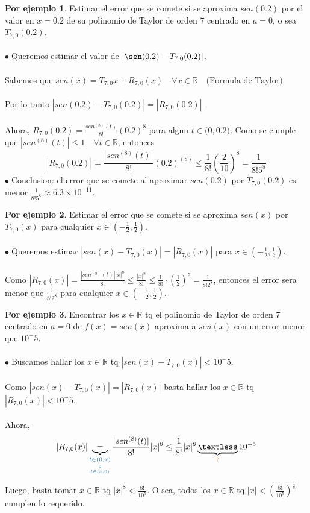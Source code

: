 \documentclass{article}
\theoremstyle{definition}
\newtheorem*{ej}{Por ejemplo}
\theoremstyle{remark}
\newcommand\bl{$\bullet\;$}
\begin{document}
\begin{ej}
  Estimar el error que se comete si se aproxima $sen(0.2)$ por el valor en $x=0.2$ de su polinomio de Taylor de orden $7$ centrado en $a=0$, o sea $T_{7,0}(0.2)$. \\ \\ 
  \bl Queremos estimar el valor de $|\sen(0.2)-T_{7,0}(0.2)|$. \\\\ Sabemos que $sen(x)=T_{7,0}{x}+R_{7,0}(x) \quad \forall x \in \mathbb{R} \quad \big(\text{Formula de Taylor}\big)$ \\\\ Por lo tanto $|sen(0.2)-T_{7,0}(0.2)|=|R_{7,0}(0.2)|$. \\ \\Ahora, $R_{7,0}(0.2)=\frac{sen^{(8)}(t)}{8!}(0.2)^8$ para algun $t \in \big(0,0.2\big)$. Como se cumple que $|sen^{(8)}(t)|\leq 1 \quad \forall t \in \mathbb{R}$, entonces \[ 
    |R_{7,0}(0.2)|=\frac{|sen^{(8)}(t)|}{8!}(0.2)^{(8)} \leq \frac{1}{8!}\left(\frac{2}{10}\right)^8 = \frac{1}{8!5^8}
\]
\bl \underline{Conclusion}: el error que se comete al aproximar $sen(0.2)$ por $T_{7,0}(0.2)$ es menor $\frac{1}{8!5^8} \approx 6.3\times10^{-11}$.
\end{ej}
\begin{ej}
  Estimar el error que se comete si se aproxima $sen(x)$ por $T_{7,0}(x)$ para cualquier $x \in \left(-\frac{1}{2},\frac{1}{2}\right)$. \\ \\
  \bl Queremos estimar $|sen(x)-T_{7,0}(x)|=|R_{7,0}(x)|$ para $x \in \left(-\frac{1}{2},\frac{1}{2}\right)$.
  \\\\
  Como $|R_{7,0}(x)|=\frac{|sen^{(8)}(t)||x|^8}{8!} \leq \frac{|x|^8}{8!} \leq \frac{1}{8!} \cdot\left(\frac{1}{2}\right)^8 = \frac{1}{8!2^8}$, entonces el error sera menor que $\frac{1}{8!2^8}$ para cualquier $x \in \left(-\frac{1}{2},\frac{1}{2}\right)$.
\end{ej}\pagebreak
\begin{ej}
  Encontrar los $x \in \mathbb{R}$ tq el polinomio de Taylor de orden $7$ centrado en $a=0$ de $f(x)=sen(x)$ aproxima a $sen(x)$ con un error menor que $10^-5$. \\\\
  \bl Buscamos hallar los $x \in \mathbb{R}$ tq $|sen(x)-T_{7,0}(x)|<10^-5$.\\\\
  Como $|sen(x)-T_{7,0}(x)|=|R_{7,0}(x)|$ basta hallar los $x \in \mathbb{R}$ tq $|R_{7,0}(x)| < 10^-5$. \\\\
  Ahora, \[
  |R_{7,0}(x)| \underbrace{=}_{\textcolor{azulp2}{\underset{\underset{t \in (x,0)}{\text{o}}}{t \in (0,x)}}} \frac{|sen^{(8)}(t)|}{8!} |x|^8 \leq \frac{1}{8!}|x|^8 \underbrace{\textless}_{\textcolor{rojop2}{?}} 10^{-5}
\]
Luego, basta tomar $x \in \mathbb{R}$ tq $|x|^8 < \frac{8!}{10^5}$. O sea, todos los $x \in \mathbb{R}$ tq $|x| < \left(\frac{8!}{10^5}\right)^{\frac{1}{8}}$ cumplen lo requerido.
\end{ej}
\end{document}
